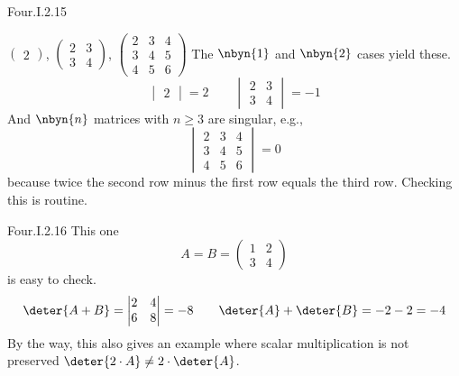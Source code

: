\begin{ans}{Four.I.2.15}
      \begin{exparts}
        \partsitem
          $\begin{pmatrix}
            2
          \end{pmatrix}$,
          $\begin{pmatrix}
            2  &3  \\
            3  &4
          \end{pmatrix}$,
          $\begin{pmatrix}
            2  &3  &4  \\
            3  &4  &5  \\
            4  &5  &6
          \end{pmatrix}$
        \partsitem The $\nbyn{1}$ and $\nbyn{2}$ cases yield these.
          \begin{equation*}
            \begin{vmatrix}
              2
            \end{vmatrix}
            =2
            \qquad
            \begin{vmatrix}
              2  &3  \\
              3  &4
            \end{vmatrix}=-1
          \end{equation*}
          And $\nbyn{n}$ matrices with $n\geq 3$ are singular, e.g.,
          \begin{equation*}
            \begin{vmatrix}
              2  &3  &4  \\
              3  &4  &5  \\
              4  &5  &6
            \end{vmatrix}=0
          \end{equation*}
          because twice the second row minus the first row
          equals the third row.
          Checking this is routine.
      \end{exparts}
    
\end{ans}
\begin{ans}{Four.I.2.16}
      This one
      \begin{equation*}
         A=B=
         \begin{pmatrix}
           1  &2  \\
           3  &4
         \end{pmatrix}
      \end{equation*}
      is easy to check.
      \begin{equation*}
         \deter{A+B}
         =
         \begin{vmatrix}
           2  &4  \\
           6  &8
         \end{vmatrix}
         =-8
         \qquad
         \deter{A}+\deter{B}
         =
         -2-2
         =-4
      \end{equation*}
      By the way, this also gives an example where scalar multiplication
      is not preserved
      $\deter{2\cdot A}\neq 2\cdot\deter{A}$.
     
\end{ans}
